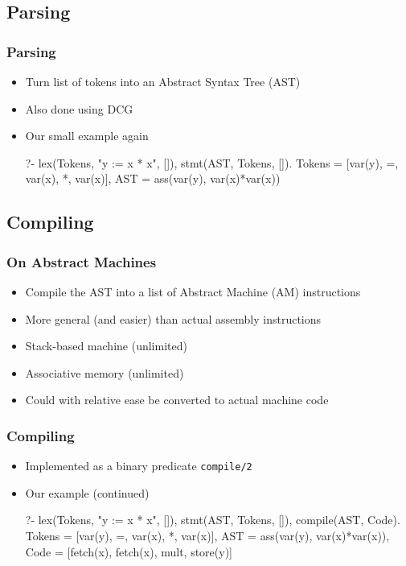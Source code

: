 \documentclass[]{beamer}
\begin{document}
\subsection{Parsing}
\begin{frame}[fragile]
\frametitle{Parsing}
\begin{itemize}
	\item Turn list of tokens into an Abstract Syntax Tree (AST)
	\item Also done using DCG
	\item Our small example again
\begin{boxedverbatim}
?- lex(Tokens, "y := x * x", []),
   stmt(AST, Tokens, []).
Tokens = [var(y), =, var(x), *, var(x)],
AST = ass(var(y), var(x)*var(x))
\end{boxedverbatim}
\end{itemize}
\end{frame}

\subsection{Compiling}

\begin{frame}[fragile]
\frametitle{On Abstract Machines}
\begin{itemize}
	\item Compile the AST into a list of Abstract Machine (AM) instructions
	\item More general (and easier) than actual assembly instructions
	\item Stack-based machine (unlimited)
	\item Associative memory (unlimited)
	\item Could with relative ease be converted to actual machine code
\end{itemize}
\end{frame}

\begin{frame}[fragile]
\frametitle{Compiling}
\begin{itemize}
	\item Implemented as a binary predicate \verb|compile/2|
	\item Our example (continued)
\begin{boxedverbatim}
?- lex(Tokens, "y := x * x", []), 
   stmt(AST, Tokens, []), 
   compile(AST, Code).
Tokens = [var(y), =, var(x), *, var(x)],
AST = ass(var(y), var(x)*var(x)),
Code = [fetch(x), fetch(x), mult, store(y)]
\end{boxedverbatim}
\end{itemize}
\end{frame}
\end{document}
